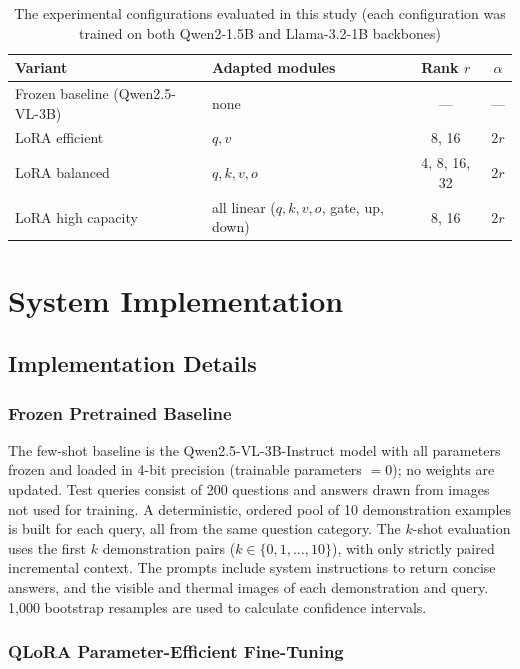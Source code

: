 \documentclass[conference]{IEEEtran}
\begin{document}
\begin{table}[t]
\centering
\caption{The experimental configurations evaluated in this study (each configuration was trained on both Qwen2-1.5B and Llama-3.2-1B backbones)}
\label{tab:variants}
\footnotesize
\setlength{\tabcolsep}{3pt}
\begin{tabular}{@{}P{0.38\columnwidth}P{0.30\columnwidth}cc@{}}
\toprule
\textbf{Variant} & \textbf{Adapted modules} & \textbf{Rank $r$} & \textbf{$\alpha$} \\
\midrule
Frozen baseline (Qwen2.5-VL-3B) & none & --- & --- \\
LoRA efficient & $q,v$ & 8, 16 & $2r$ \\
LoRA balanced & $q,k,v,o$ & 4, 8, 16, 32 & $2r$ \\
LoRA high capacity & all linear ($q,k,v,o$, gate, up, down) & 8, 16 & $2r$ \\
\bottomrule
\end{tabular}
\end{table}

\section{System Implementation}

\subsection{Implementation Details}

\subsubsection{Frozen Pretrained Baseline}

The few-shot baseline is the Qwen2.5-VL-3B-Instruct model \cite{bai2025} with all parameters frozen and loaded in 4-bit precision (trainable parameters $=0$); no weights are updated. Test queries consist of 200 questions and answers drawn from images not used for training. A deterministic, ordered pool of 10 demonstration examples is built for each query, all from the same question category. The $k$-shot evaluation uses the first $k$ demonstration pairs ($k \in \{0,1,\dots,10\}$), with only strictly paired incremental context. The prompts include system instructions to return concise answers, and the visible and thermal images of each demonstration and query. 1,000 bootstrap resamples are used to calculate confidence intervals.

\subsubsection{QLoRA Parameter-Efficient Fine-Tuning}
\end{document}
